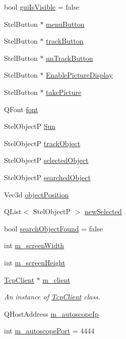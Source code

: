 \begin{DoxyCompactItemize}
bool \hyperlink{class_autoscope_ac995550136b93293df166aead2eda5b7}{gui\+Is\+Visible} = false
\item 
Stel\+Button $\ast$ \hyperlink{class_autoscope_a5b14962697fbd8fffac986df08aee611}{menu\+Button}
\item 
Stel\+Button $\ast$ \hyperlink{class_autoscope_a816e3212639b4204e9917704e02b0d09}{track\+Button}
\item 
Stel\+Button $\ast$ \hyperlink{class_autoscope_a5d3be6a8522dc18b921936b57c8e661c}{un\+Track\+Button}
\item 
Stel\+Button $\ast$ \hyperlink{class_autoscope_aa3b4663ded25875ce8fb21906b38d174}{Enable\+Picture\+Display}
\item 
Stel\+Button $\ast$ \hyperlink{class_autoscope_a8f64e1d50e979751403a70008f0d01da}{take\+Picture}
\item 
Q\+Font \hyperlink{class_autoscope_a168d6d47f412a7966c2f5ddeb0f4cc79}{font}
\item 
Stel\+ObjectP \hyperlink{class_autoscope_a5bcfda333996f4fc3a959306be3e3d07}{Sun}
\item 
Stel\+ObjectP \hyperlink{class_autoscope_a170fbbc7b2a719517912aa3614727021}{track\+Object}
\item 
Stel\+ObjectP \hyperlink{class_autoscope_a954a97691346ff2fb0981877554c1ac3}{selected\+Object}
\item 
Stel\+ObjectP \hyperlink{class_autoscope_aba59abee95b4b5443709dce1d61a3498}{searched\+Object}
\item 
Vec3d \hyperlink{class_autoscope_aff4d8365cc96689c79f3370ebde45b9e}{object\+Position}
\item 
Q\+List$<$ Stel\+ObjectP $>$ \hyperlink{class_autoscope_aa02f096fc07e27ef3843eb4f8ba2c5a5}{new\+Selected}
\item 
bool \hyperlink{class_autoscope_adcd9ee42b339c3c526231ed97c0ef6fa}{search\+Object\+Found} = false
\item 
int \hyperlink{class_autoscope_afe92778dfed037b0ec41ad51f8086a56}{m\+\_\+screen\+Width}
\item 
int \hyperlink{class_autoscope_a003c73a069f579f831eeaa8f04cf2977}{m\+\_\+screen\+Height}
\item 
\hyperlink{class_tcp_client}{Tcp\+Client} $\ast$ \hyperlink{class_autoscope_af6e7a8d7cf7014e9b0f9296e2b7d7fd5}{m\+\_\+client}
\begin{DoxyCompactList}\small\item\em An instance of \hyperlink{class_tcp_client}{Tcp\+Client} class. \end{DoxyCompactList}\item 
Q\+Host\+Address \hyperlink{class_autoscope_aa3c1b8d19881d76c680b8c4ea1692c89}{m\+\_\+autoscope\+Ip}
\item 
int \hyperlink{class_autoscope_abb67968cc6c6678995512aa1a05ad0e1}{m\+\_\+autoscope\+Port} = 4444
\end{DoxyCompactItemize}


